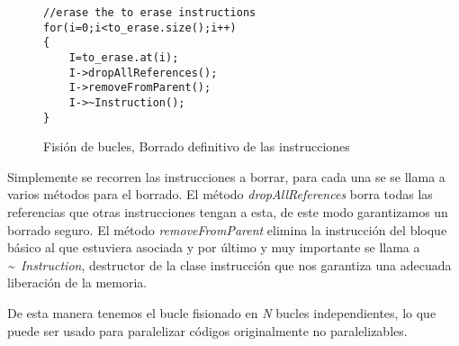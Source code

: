 \begin{figure}[t]
\begin{lstlisting}
//erase the to erase instructions
for(i=0;i<to_erase.size();i++)
{
	I=to_erase.at(i);
	I->dropAllReferences();
	I->removeFromParent();
	I->~Instruction();
}
\end{lstlisting}
\caption{Fisión de bucles, Borrado definitivo de las instrucciones}
\label{FIG:LoopFisionErase}
\end{figure}

Simplemente se recorren las instrucciones a borrar, para cada una se se llama a varios métodos para el borrado. El método \textit{dropAllReferences} borra todas las referencias que otras instrucciones tengan a esta, de este modo garantizamos un borrado seguro. El método \textit{removeFromParent} elimina la instrucción del bloque básico al que estuviera asociada y por último y muy importante se llama a \textit{\~~Instruction}, destructor de la clase instrucción que nos garantiza una adecuada liberación de la memoria.

De esta manera tenemos el bucle fisionado en \textit{N} bucles independientes, lo que puede ser usado para paralelizar códigos originalmente no paralelizables.


